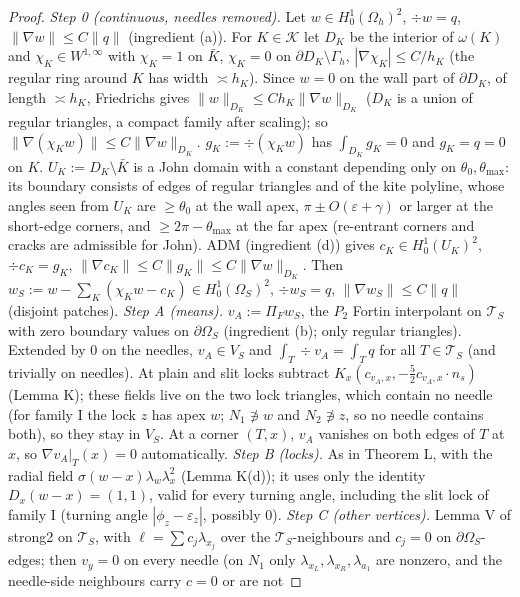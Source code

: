 \documentclass[11pt]{article}
\theoremstyle{remark}
\newcommand{\norm}[1]{\|#1\|}
\begin{document}
\begin{proof}
\emph{Step 0 (continuous, needles removed).} Let $w\in H^1_0(\Omega_h)^2$, $\div w=q$, $\norm{\nabla w}\le C\norm q$ (ingredient (a)). For $K\in\mathcal K$ let
$D_K$ be the interior of $\omega(K)$ and $\chi_K\in W^{1,\infty}$ with $\chi_K=1$ on $\bar K$, $\chi_K=0$ on $\partial D_K\setminus\Gamma_h$, $|\nabla\chi_K|\le C/h_K$
(the regular ring around $K$ has width $\asymp h_K$). Since $w=0$ on the wall part of $\partial D_K$, of length $\asymp h_K$, Friedrichs gives
$\norm{w}_{D_K}\le Ch_K\norm{\nabla w}_{D_K}$ ($D_K$ is a union of regular triangles, a compact family after scaling); so $\norm{\nabla(\chi_Kw)}\le C\norm{\nabla w}_{D_K}$.
$g_K:=\div(\chi_Kw)$ has $\int_{D_K}g_K=0$ and $g_K=q=0$ on $K$. $U_K:=D_K\setminus\bar K$ is a John domain with a constant depending only on
$\theta_0,\theta_{\max}$: its boundary consists of edges of regular triangles and of the kite polyline, whose angles seen from $U_K$ are
$\ge\theta_0$ at the wall apex, $\pi\pm O(\varepsilon+\gamma)$ or larger at the short-edge corners, and $\ge2\pi-\theta_{\max}$ at the far apex
(re-entrant corners and cracks are admissible for John). ADM (ingredient (d)) gives $c_K\in H^1_0(U_K)^2$, $\div c_K=g_K$,
$\norm{\nabla c_K}\le C\norm{g_K}\le C\norm{\nabla w}_{D_K}$. Then $w_S:=w-\sum_K(\chi_Kw-c_K)\in H^1_0(\Omega_S)^2$, $\div w_S=q$, $\norm{\nabla w_S}\le C\norm q$
(disjoint patches).
\emph{Step A (means).} $v_A:=\Pi_Fw_S$, the $P_2$ Fortin interpolant on $\mathcal T_S$ with zero boundary values on $\partial\Omega_S$ (ingredient (b); only regular
triangles). Extended by $0$ on the needles, $v_A\in V_S$ and $\int_T\div v_A=\int_Tq$ for all $T\in\mathcal T_S$ (and trivially on needles).
At plain and slit locks subtract $K_x(c_{v_A,x},-\frac52c_{v_A,x}\cdot n_s)$ (Lemma K); these fields live on the two lock triangles, which contain no
needle (for family I the lock $z$ has apex $w$; $N_1\not\ni w$ and $N_2\not\ni z$, so no needle contains both), so they stay in $V_S$. At a corner
$(T,x)$, $v_A$ vanishes on both edges of $T$ at $x$, so $\nabla v_A|_T(x)=0$ automatically.
\emph{Step B (locks).} As in Theorem L, with the radial field $\sigma(w-x)\lambda_w\lambda_x^2$ (Lemma K(d)); it uses only the identity $D_x(w-x)=(1,1)$,
valid for every turning angle, including the slit lock of family I (turning angle $|\phi_z-\varepsilon_z|$, possibly $0$).
\emph{Step C (other vertices).} Lemma V of strong2 on $\mathcal T_S$, with $\ell=\sum c_j\lambda_{x_j}$ over the $\mathcal T_S$-neighbours and $c_j=0$ on $\partial\Omega_S$-edges;
then $v_y=0$ on every needle (on $N_1$ only $\lambda_{x_L},\lambda_{x_R},\lambda_{a_1}$ are nonzero, and the needle-side neighbours carry $c=0$ or are not

\end{proof}
\end{document}
